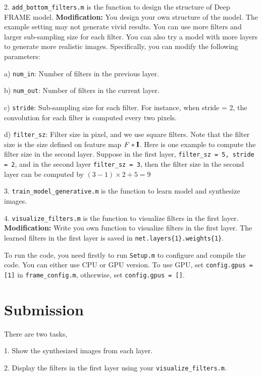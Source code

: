 \documentclass[11pt]{article}
\def\I{{\bf I}}
\begin{document}
2. \verb|add_bottom_filters.m| is the function to design the structure of Deep FRAME model. \textbf{Modification:} You design your own structure of the model. The example setting may not generate vivid results. You can use more filters and larger sub-sampling size for each filter. You can also try a model with more layers to generate more realistic images. Specifically, you can modify the following parameters:

a) \verb|num_in|: Number of filters in the previous layer.

b) \verb|num_out|: Number of filters in the current layer.

c) \verb|stride|: Sub-sampling size for each filter. For instance, when stride = 2, the convolution for each filter is computed every two pixels. 

d) \verb|filter_sz|: Filter size in pixel, and we use square filters. Note that the filter size is the size defined on feature map $F*\I$. Here is one example to compute the filter size in the second layer. Suppose in the first layer, \verb|filter_sz = 5, stride = 2|, and in the second layer \verb|filter_sz = 3|, then the filter size in the second layer can be computed by $(3-1)\times 2 + 5 = 9$

3. \verb|train_model_generative.m| is the function to learn model and synthesize images.

4. \verb|visualize_filters.m| is the function to visualize filters in the first layer. \textbf{Modification:} Write you own function to visualize filters in the first layer. The learned filters in the first layer is saved in \verb|net.layers{1}.weights{1}|.

To run the code, you need firstly to run \verb|Setup.m| to configure and compile the code. You can either use CPU or GPU version. To use GPU, set \verb|config.gpus = [1]| in \verb|frame_config.m|, otherwise, set \verb|config.gpus = []|.

\section{Submission}
There are two tasks, 

1. Show the synthesized images from each layer.

2. Display the filters in the first layer using your \verb|visualize_filters.m|.


	
\end{document}
